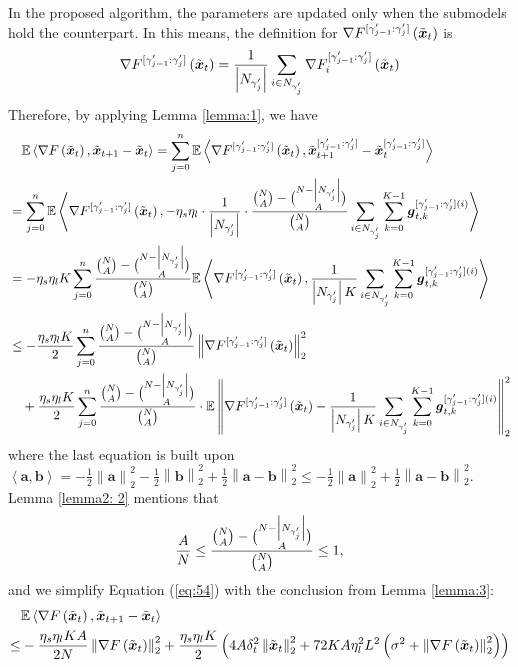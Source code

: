 \documentclass{article}
\theoremstyle{plain}
\theoremstyle{definition}
\theoremstyle{remark}
\newcommand{\E}{\mathbb{E}}
\renewcommand{\eqref}[1]{Equation (\ref{#1})}
\newcommand{\bracket}[1]{\left(#1\right)}
\newcommand{\norm}[1]{\left\|#1\right\|_2^2}
\newcommand{\innerproduct}[2]{\left\langle#1, #2\right\rangle}
\newcommand{\globaloutergradgammacons}[2]{\nabla F^{[\gamma_{#1-1}': \gamma_{#1}']}\bracket{\x{#2}}}
\begin{document}
In the proposed algorithm, the parameters are updated only when the submodels hold the counterpart. In this means, the definition for $\gggamma{j}{t}$ is 
\begin{align}
    \gggamma{j}{t} = \frac{1}{\left|\n{j}\right|} \sum_{i \in \n{j}} \gggamma{j}{t}{i}
\end{align}
Therefore, by applying Lemma \ref{lemma:1}, we have 
\begin{align}
&\quad \E \innerproduct{\grad{t}}{\x{t+1} - \x{t}} = \sum_{j=0}^n \E\innerproduct{\gggamma{j}{t}}{\x{t+1}^{[\gamma_{j-1}':\gamma_{j}']} - \x{t}^{[\gamma_{j-1}':\gamma_{j}']}} \\
&= \sum_{j=0}^n \E \innerproduct{\gggamma{j}{t}}{ -\eta_s \eta_l \cdot \frac{1}{\left|\n{j}\right|} \cdot \frac{\binom{N}{A} - \binom{N - \left|\n{j}\right|}{A}}{\binom{N}{A}} \sum_{i \in \n{j}} \sum_{k=0}^{K-1} \boldsymbol{g}_{t,k}^{[\gamma_{j-1}':\gamma_{j}'](i)} } \\
&= -\eta_s \eta_l K \sum_{j=0}^n \frac{\binom{N}{A} - \binom{N - \left|\n{j}\right|}{A}}{\binom{N}{A}} \E \innerproduct{\gggamma{j}{t}}{  \frac{1}{\left|\n{j}\right| K} \sum_{i \in \n{j}} \sum_{k=0}^{K-1} \boldsymbol{g}_{t,k}^{[\gamma_{j-1}':\gamma_{j}'](i)} } \\
&\leq -\frac{\eta_s \eta_l K}{2} \sum_{j=0}^n \frac{\binom{N}{A} - \binom{N - \left|\n{j}\right|}{A}}{\binom{N}{A}} \norm{\gggamma{j}{t}} \\
&\quad + \frac{\eta_s \eta_l K}{2} \sum_{j=0}^n \frac{\binom{N}{A} - \binom{N - \left|\n{j}\right|}{A}}{\binom{N}{A}} \cdot \E\norm{\globaloutergradgammacons{j}{t} - \frac{1}{\left|\n{j}\right| K}  \sum_{i \in \n{j}} \sum_{k=0}^{K-1} \boldsymbol{g}_{t,k}^{[\gamma_{j-1}':\gamma_{j}'](i)} } \label{eq:54}
\end{align}
where the last equation is built upon $\innerproduct{\boldsymbol{a}}{\boldsymbol{b}} = -\frac{1}{2} \norm{\boldsymbol{a}} - \frac{1}{2} \norm{\boldsymbol{b}} + \frac{1}{2} \norm{\boldsymbol{a} - \boldsymbol{b}} \leq  -\frac{1}{2} \norm{\boldsymbol{a}} +  \frac{1}{2} \norm{\boldsymbol{a} - \boldsymbol{b}}$. Lemma \ref{lemma2: 2} mentions that
\begin{align}
    \frac{A}{N} \leq  \frac{\binom{N}{A} - \binom{N - \left|N_{\gamma_{j}'}\right|}{A}}{\binom{N}{A}} \leq 1, 
\end{align}
and we simplify \eqref{eq:54} with the conclusion from Lemma \ref{lemma:3}: 
\begin{align}
&\E \innerproduct{\grad{t}}{\x{t+1} - \x{t}}\\
\leq &-\frac{\eta_s \eta_l K A}{2 N} \norm{\grad{t}}  + \frac{\eta_s \eta_l K}{2} \bracket{4A\delta_t^2 \norm{\x{t}} + 72 K A \eta_l^2 L^2 \bracket{\sigma^2 + \norm{\grad{t}}} }
\end{align}
\end{document}

